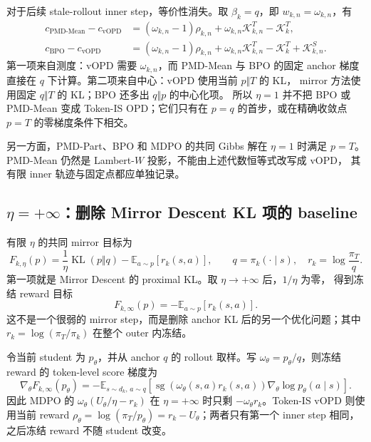 对于后续 stale-rollout inner step，等价性消失。取 $\beta_k=q$，即
$w_{k,n}=\omega_{k,n}$，有
\begin{align}
c_{\mathrm{PMD\text{-}Mean}}-c_{\mathrm{vOPD}}
&=(\omega_{k,n}-1)\rho_{k,n}
 +\omega_{k,n}\mathcal K_{k,n}^{T}-\mathcal K_k^{T},\\
c_{\mathrm{BPO}}-c_{\mathrm{vOPD}}
&=(\omega_{k,n}-1)\rho_{k,n}
 +\omega_{k,n}\mathcal K_{k,n}^{T}-\mathcal K_k^{T}
 +\mathcal K_{k,n}^{S}.
\end{align}
第一项来自测度：vOPD 需要 $\omega_{k,n}$，而 PMD-Mean 与 BPO 的固定 anchor
梯度直接在 $q$ 下计算。第二项来自中心：vOPD 使用当前 $p\Vert T$ 的 KL，
mirror 方法使用固定 $q\Vert T$ 的 KL；BPO 还多出 $q\Vert p$ 的中心化项。
所以 $\eta=1$ 并不把 BPO 或 PMD-Mean 变成 Token-IS OPD；它们只有在
$p=q$ 的首步，或在精确收敛点 $p=T$ 的零梯度条件下相交。

另一方面，PMD-Part、BPO 和 MDPO 的共同 Gibbs 解在 $\eta=1$ 时满足
$p=T$。PMD-Mean 仍然是 Lambert-$W$ 投影，不能由上述代数恒等式改写成 vOPD，
其有限 inner 轨迹与固定点都应单独记录。

\subsection{$\eta=+\infty$：删除 Mirror Descent KL 项的 baseline}
\label{subsec:ch2-opd-eta-infinity}

有限 $\eta$ 的共同 mirror 目标为
\begin{equation}
\label{eq:ch2-opd-mirror-objective-eta}
F_{k,\eta}(p)=\frac{1}{\eta}\operatorname{KL}(p\Vert q)-\mathbb E_{a\sim p}[r_k(s,a)],
\qquad q=\pi_k(\cdot\mid s),\quad r_k=\log\frac{\pi_T}{q}.
\end{equation}
第一项就是 Mirror Descent 的 proximal KL。取 $\eta\to+\infty$ 后，$1/\eta$ 为零，
得到冻结 reward 目标
\begin{equation}
\label{eq:ch2-opd-frozen-reward-objective}
F_{k,\infty}(p)=-\mathbb E_{a\sim p}[r_k(s,a)].
\end{equation}
这不是一个很弱的 mirror step，而是删除 anchor KL 后的另一个优化问题；其中
$r_k=\log(\pi_T/\pi_k)$ 在整个 outer 内冻结。

令当前 student 为 $p_\theta$，并从 anchor $q$ 的 rollout 取样。写
$\omega_\theta=p_\theta/q$，则冻结 reward 的 token-level score 梯度为
\begin{equation}
\label{eq:ch2-opd-frozen-reward-gradient}
\nabla_\theta F_{k,\infty}(p_\theta)
=-\mathbb E_{s\sim d_k,\,a\sim q}
\left[\operatorname{sg}\!\left(\omega_\theta(s,a)r_k(s,a)\right)
\nabla_\theta\log p_\theta(a\mid s)\right].
\end{equation}
因此 MDPO 的 $\omega_\theta(U_\theta/\eta-r_k)$ 在 $\eta=+\infty$ 时只剩
$-\omega_\theta r_k$。Token-IS vOPD 则使用当前 reward
$\rho_\theta=\log(\pi_T/p_\theta)=r_k-U_\theta$；两者只有第一个 inner step
相同，之后冻结 reward 不随 student 改变。

